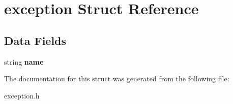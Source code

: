 \hypertarget{structexception}{}\section{exception Struct Reference}
\label{structexception}
\subsection*{Data Fields}
\begin{DoxyCompactItemize}
\item 
\hypertarget{structexception_a8ccf841cb59e451791bcb2e1ac4f1edc}{}\label{structexception_a8ccf841cb59e451791bcb2e1ac4f1edc} 
string {\bfseries name}
\end{DoxyCompactItemize}


The documentation for this struct was generated from the following file\+:\begin{DoxyCompactItemize}
\item 
exception.\+h\end{DoxyCompactItemize}
